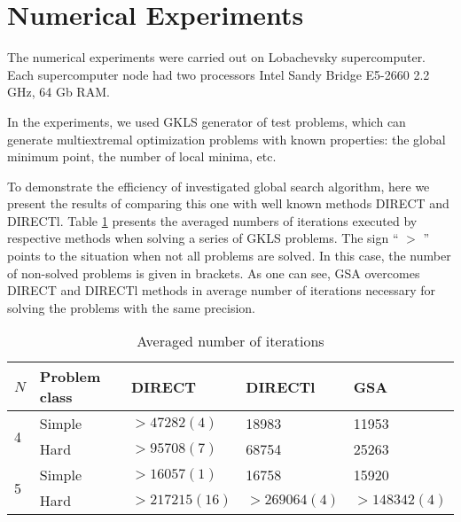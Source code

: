 \documentclass{cmi}
\begin{document}
\section{Numerical Experiments}\label{SecR}


The numerical experiments were carried out on Lobachevsky supercomputer. Each supercomputer  node had two processors Intel Sandy Bridge E5-2660 2.2 GHz, 64 Gb RAM. 

In the experiments, we used GKLS generator of test problems, which can generate multiextremal  optimization problems with known properties: the global minimum point, the number of local minima,  etc.

To demonstrate the efficiency of  investigated global search algorithm, here we present the results of  comparing this one with well known methods DIRECT and DIRECTl. Table \ref{tab:1} presents the averaged numbers of iterations executed by respective methods when  solving a series of GKLS problems. The sign `` $>$ '' points to the situation when not all problems are  solved. In this case, the number of non-solved problems is given in brackets. As one can see,  GSA overcomes DIRECT and DIRECTl methods in average number of iterations necessary for solving the problems with the same precision.


\begin{table}[!ht]
	\caption{Averaged number of iterations}
	\label{tab:1}
	\centering
	\begin{tabular}{|l|l|l|l|l|}
		\hline
		$N$                & Problem class & DIRECT         & DIRECTl       & GSA           \\ \hline
		\multirow{2}{*}{4} & Simple        & $>47282 (4)$   & 18983         & 11953         \\ \cline{2-5} 
		& Hard          & $>95708 (7)$   & 68754         & 25263         \\ \hline
		\multirow{2}{*}{5} & Simple        & $>16057 (1)$   & 16758         & 15920         \\ \cline{2-5} 
		& Hard          & $>217215 (16)$ & $>269064 (4)$ & $>148342 (4)$ \\ \hline
	\end{tabular}
\end{table}


\end{document}
